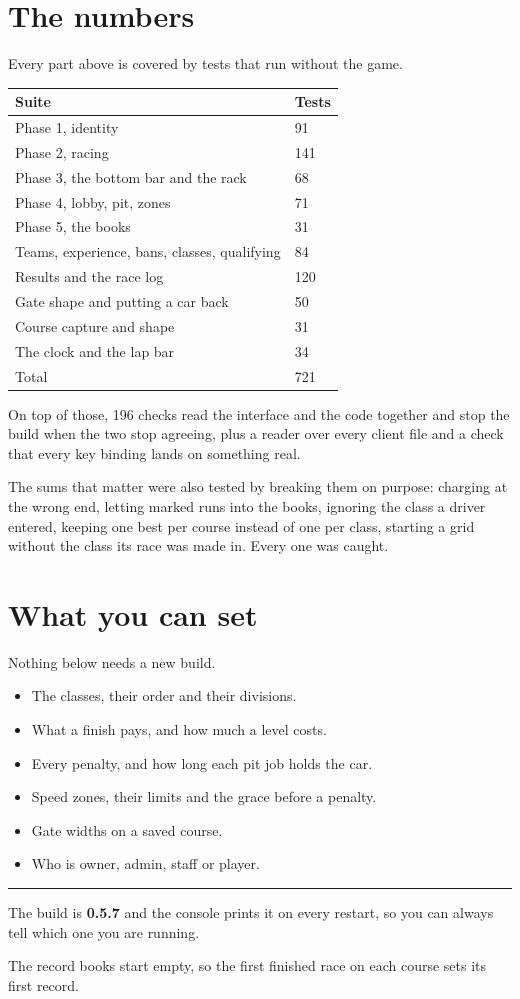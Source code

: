 \documentclass[11pt,a4paper]{article}
\begin{document}
\section{The numbers}

Every part above is covered by tests that run without the game.

\begin{longtable}{@{}p{70mm}p{25mm}@{}}
\toprule
\textbf{Suite} & \textbf{Tests} \\
\midrule
\endhead
Phase 1, identity                      & 91 \\
Phase 2, racing                        & 141 \\
Phase 3, the bottom bar and the rack   & 68 \\
Phase 4, lobby, pit, zones             & 71 \\
Phase 5, the books                     & 31 \\
Teams, experience, bans, classes, qualifying & 84 \\
Results and the race log               & 120 \\
Gate shape and putting a car back      & 50 \\
Course capture and shape               & 31 \\
The clock and the lap bar              & 34 \\
\midrule
Total                                  & 721 \\
\bottomrule
\end{longtable}

On top of those, 196 checks read the interface and the code together and stop
the build when the two stop agreeing, plus a reader over every client file and
a check that every key binding lands on something real.

The sums that matter were also tested by breaking them on purpose: charging at
the wrong end, letting marked runs into the books, ignoring the class a driver
entered, keeping one best per course instead of one per class, starting a grid
without the class its race was made in. Every one was caught.

\section{What you can set}

Nothing below needs a new build.

\begin{itemize}
  \item The classes, their order and their divisions.
  \item What a finish pays, and how much a level costs.
  \item Every penalty, and how long each pit job holds the car.
  \item Speed zones, their limits and the grace before a penalty.
  \item Gate widths on a saved course.
  \item Who is owner, admin, staff or player.
\end{itemize}

\vspace{10pt}
\hrule
\vspace{6pt}

{\small The build is \textbf{0.5.7} and the console prints it on every
restart, so you can always tell which one you are running.

The record books start empty, so the first finished race on each course sets
its first record.}
\end{document}
